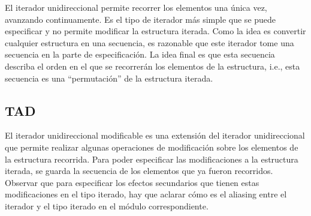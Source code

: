 \documentclass[a4paper,10pt]{article}
\begin{document}
El iterador unidireccional permite recorrer los elementos una única vez, avanzando continuamente.  Es el tipo de iterador más simple que se puede especificar y no permite modificar la estructura iterada.  Como la idea es convertir cualquier estructura en una secuencia, es razonable que este iterador tome una secuencia en la parte de especificación.  La idea final es que esta secuencia describa el orden en el que se recorrerán los elementos de la estructura, i.e., esta secuencia es una ``permutación'' de la estructura iterada.

\begin{tad}{}




  \tadObservadores

  \tadGeneradores

  \tadOtrasOperaciones


  \tadAxiomas
\end{tad}

\subsection{TAD }

El iterador unidireccional modificable es una extensión del iterador unidireccional que permite realizar algunas operaciones de modificación sobre los elementos de la estructura recorrida.  Para poder especificar las modificaciones a la estructura iterada, se guarda la secuencia de los elementos que ya fueron recorridos.  Observar que para especificar los efectos secundarios que tienen estas modificaciones en el tipo iterado, hay que aclarar cómo es el aliasing entre el iterador y el tipo iterado en el módulo correspondiente.
\end{document}
